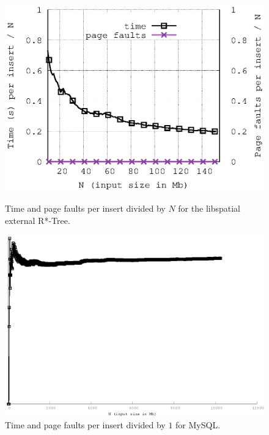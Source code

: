 \documentclass[twoside,11pt,openright]{report}
\begin{document}
\begin{figure}
\begin{minipage}{0.48\columnwidth}
  \centering
  \includegraphics[width=\linewidth]{../src/experiments/insert_experiment_results/2016-05-27.13_39_38/time_and_pfs}%
  \caption{Time and page faults per insert divided by $N$ for the libspatial external R*-Tree.}
  \label{fig:time_divided_with_asymptotic_libspatial}
\end{minipage}%
\hfill
\begin{minipage}{0.48\columnwidth}
  \centering
  \includegraphics[width=\linewidth]{../src/experiments/insert_experiment_results/2016-05-06.14_11_08/time_divided_with_asymptotic_mysql}%
  \caption{Time and page faults per insert divided by $1$ for MySQL.}
  \label{fig:time_divided_with_asymptotic_mysql}
\end{minipage}
\end{figure}
\end{document}
